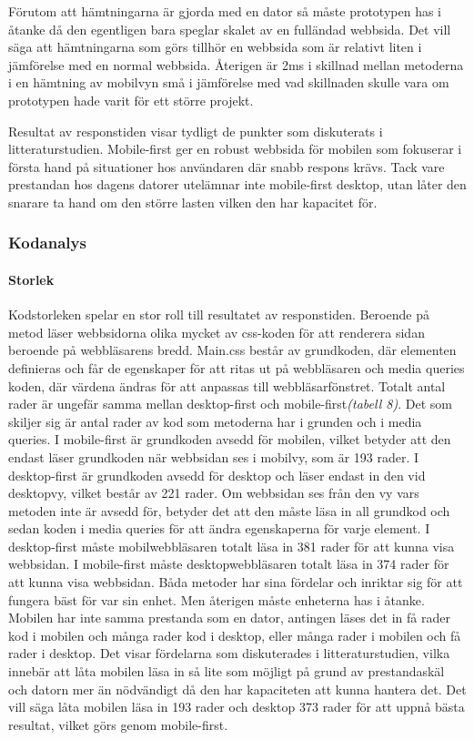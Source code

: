 \documentclass[11pt]{article}
\begin{document}
Förutom att hämtningarna är gjorda med en dator så måste prototypen has i åtanke då den egentligen bara speglar skalet av en fulländad webbsida. Det vill säga att hämtningarna som görs tillhör en webbsida som är relativt liten i jämförelse med en normal webbsida. Återigen är 2ms i skillnad mellan metoderna i en hämtning av mobilvyn små i jämförelse med vad skillnaden skulle vara om prototypen hade varit för ett större projekt.

Resultat av responstiden visar tydligt de punkter som diskuterats i litteraturstudien. Mobile-first ger en robust webbsida för mobilen som fokuserar i första hand på situationer hos användaren där snabb respons krävs. Tack vare prestandan hos dagens datorer utelämnar inte mobile-first desktop, utan låter den snarare ta hand om den större lasten vilken den har kapacitet för.

\subsubsection{Kodanalys}
\paragraph{Storlek}\mbox{}

Kodstorleken spelar en stor roll till resultatet av responstiden. Beroende på metod läser webbsidorna olika mycket av css-koden för att renderera sidan beroende på webbläsarens bredd. Main.css består av grundkoden, där elementen definieras och får de egenskaper för att ritas ut på webbläsaren och media queries koden, där värdena ändras för att anpassas till webbläsarfönstret. Totalt antal rader är ungefär samma mellan desktop-first och mobile-first\textit{(tabell 8)}. Det som skiljer sig är antal rader av kod som metoderna har i grunden och i media queries. I mobile-first är grundkoden avsedd för mobilen, vilket betyder att den endast läser grundkoden när webbsidan ses i mobilvy, som är 193 rader. I desktop-first är grundkoden avsedd för desktop och läser endast in den vid desktopvy, vilket består av 221 rader. Om webbsidan ses från den vy vars metoden inte är avsedd för, betyder det att den måste läsa in all grundkod och sedan koden i media queries för att ändra egenskaperna för varje element. I desktop-first måste mobilwebbläsaren totalt läsa in 381 rader för att kunna visa webbsidan. I mobile-first måste desktopwebbläsaren totalt läsa in 374 rader för att kunna visa webbsidan. Båda metoder har sina fördelar och inriktar sig för att fungera bäst för var sin enhet. Men återigen måste enheterna has i åtanke. Mobilen har inte samma prestanda som en dator, antingen läses det in få rader kod i mobilen och många rader kod i desktop, eller många rader i mobilen och få rader i desktop. Det visar fördelarna som diskuterades i litteraturstudien, vilka innebär att låta mobilen läsa in så lite som möjligt på grund av prestandaskäl och datorn mer än nödvändigt då den har kapaciteten att kunna hantera det. Det vill säga låta mobilen läsa in 193 rader och desktop 373 rader för att uppnå bästa resultat, vilket görs genom mobile-first.
\end{document}
